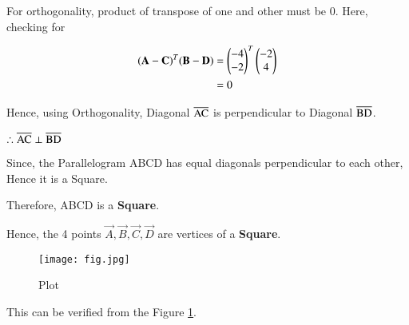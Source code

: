 \documentclass[journal,12pt,twocolumn]{IEEEtran}
\begin{document}
For orthogonality, product of transpose of one and other must be 0. Here, checking for

\begin{align}
    (\mathbf{A} - \mathbf{C})^T(\mathbf{B} - \mathbf{D}) &= \begin{pmatrix}-4\\-2\end{pmatrix}^T\begin{pmatrix}-2\\4\end{pmatrix} \\
    &= 0
\end{align}

Hence, using Orthogonality, Diagonal $\overline{\rm AC}$ is perpendicular to Diagonal $\overline{\rm BD}$.

$\therefore \overline{\rm AC} \perp \overline{\rm BD}$

Since, the Parallelogram ABCD has equal diagonals perpendicular to each other, Hence it is a Square.

Therefore, ABCD is a \textbf{Square}.

Hence, the 4 points $\vec{A},\vec{B},\vec{C},\vec{D}$ are vertices of a \textbf{Square}. 

\begin{figure}[htp]
    \centering
    \texttt{[image: fig.jpg]}
    \caption{Plot}
    \label{fig:label}
\end{figure}
This can be verified from the Figure \ref{fig:label}.
\end{document}
